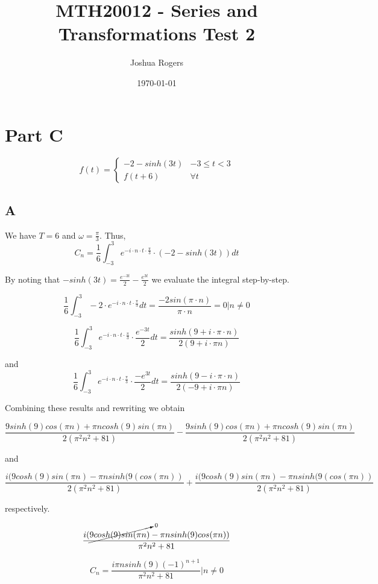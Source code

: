 \documentclass{article}
\title{\vspace{-4cm}MTH20012 - Series and Transformations Test 2}
\author{Joshua Rogers}
\date\today
\begin{document}
\maketitle 

\section*{Part C}


\[ f(t) = \begin{cases}
      -2 - sinh(3t) & -3\leq t < 3 \\
      f(t+6) & \forall t
   \end{cases}
\]


\subsection*{A}

We have $T=6$ and $\omega = \frac{\pi}{3}$. Thus,
$$C_n = \frac{1}{6} \int_{-3}^{3} e^{-i \cdot n \cdot t \cdot \frac{\pi}{3}} \cdot \left(-2-sinh(3t)\right) dt$$

By noting that $-sinh(3t) = \frac{e^{-3t}}{2} - \frac{e^{3t}}{2}$ we evaluate the integral step-by-step.

$$
\frac{1}{6} \int_{-3}^{3} -2 \cdot e^{-i \cdot n \cdot t \cdot \frac{\pi}{3}} dt = \frac{-2sin(\pi \cdot n)}{\pi \cdot n} = 0 \Bigr|n \neq 0
$$

$$
\frac{1}{6} \int_{-3}^{3}  e^{-i \cdot n \cdot t \cdot \frac{\pi}{3}} \cdot \frac{e^{-3t}}{2} dt = \frac{sinh(9+i\cdot \pi \cdot n)}{2(9 + i\cdot \pi n)}
$$

and
$$
\frac{1}{6} \int_{-3}^{3}  e^{-i \cdot n \cdot t \cdot \frac{\pi}{3}} \cdot \frac{-e^{3t}}{2} dt = \frac{sinh(9-i\cdot \pi \cdot n)}{2(-9 + i\cdot \pi n)}
$$

Combining these results and rewriting we obtain

$$
\frac{9sinh(9)cos(\pi n)+\pi n cosh(9) sin(\pi n)}{2(\pi^2n^2+81)} - \frac{9sinh(9)cos(\pi n)+\pi n cosh(9) sin(\pi n)}{2(\pi^2n^2+81)}
$$

and

$$
\frac{i(9cosh(9)sin(\pi n) - \pi n sinh(9( cos(\pi n))}{2(\pi^2n^2+81)} + \frac{i(9cosh(9)sin(\pi n) - \pi n sinh(9( cos(\pi n))}{2(\pi^2n^2+81)}
$$

respectively.

$$
\frac{i(\cancelto{0}{9cosh(9)sin(\pi n)} - \pi n sinh(9) cos(\pi n))}{\pi^2n^2+81}
$$

$$
C_n = \frac{i\pi n sinh(9)\left(-1\right)^{n+1}}{\pi^2n^2+81} \Bigr|n \neq 0
$$
\end{document}
